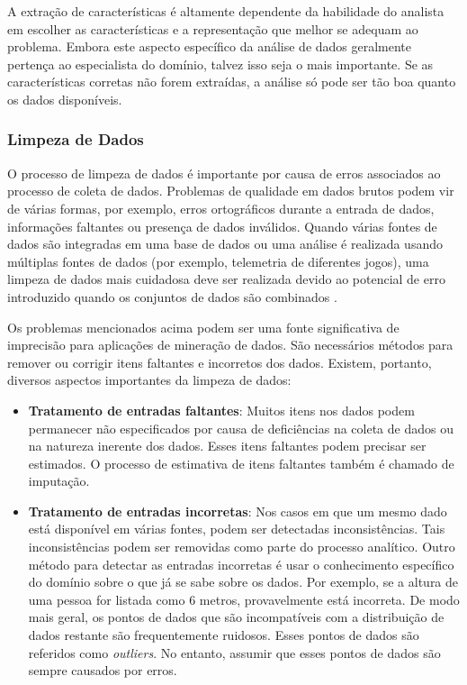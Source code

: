 A extração de características  é altamente dependente da habilidade do analista em escolher as características e a representação que melhor se adequam ao problema. Embora este aspecto específico da análise de dados geralmente pertença ao especialista do domínio, talvez isso seja o mais importante. Se as características corretas não forem extraídas, a análise só pode ser tão boa quanto os dados disponíveis.

\subsubsection{Limpeza de Dados}
O processo de limpeza de dados é importante por causa de erros associados ao processo de coleta de dados. Problemas de qualidade em dados brutos podem vir de várias formas, por exemplo, erros ortográficos durante a entrada de dados, informações faltantes ou presença de dados inválidos. Quando várias fontes de dados são integradas em uma base de dados ou uma análise  é realizada usando múltiplas fontes de dados (por exemplo, telemetria de diferentes jogos), uma limpeza de dados mais cuidadosa  deve ser realizada devido ao potencial de erro introduzido quando os conjuntos de dados são combinados \cite{el2016game}.

Os problemas mencionados acima podem ser uma fonte significativa de imprecisão para aplicações de mineração de dados. São necessários métodos para remover ou corrigir itens faltantes e incorretos dos dados. Existem, portanto, diversos aspectos importantes da limpeza de dados:

\begin{itemize}
  \item
\textbf{Tratamento de entradas faltantes}: Muitos itens nos dados podem permanecer não especificados por causa de deficiências na coleta de dados ou na natureza inerente dos dados. Esses itens faltantes podem precisar ser estimados. O processo de estimativa de itens faltantes também é chamado de imputação.
  \item
\textbf{Tratamento de entradas incorretas}: Nos casos em que um mesmo dado está disponível em várias fontes, podem ser detectadas inconsistências. Tais inconsistências podem ser removidas como parte do processo analítico. Outro método para detectar as entradas incorretas é usar o conhecimento específico do domínio sobre o que já se sabe sobre os dados. Por exemplo, se a altura de uma pessoa for listada como 6 metros, provavelmente está incorreta. De modo mais geral, os pontos de dados que são incompatíveis com a distribuição de dados restante são frequentemente ruidosos. Esses pontos de dados são referidos como \textit{outliers}. No entanto,  assumir que esses pontos de dados são sempre causados por erros.
\end{itemize}

